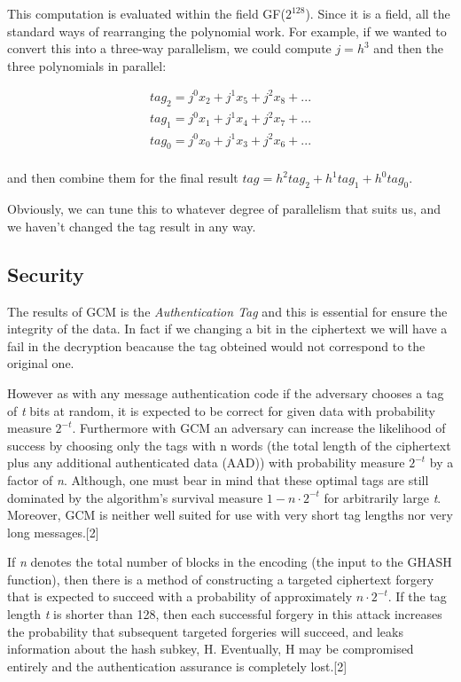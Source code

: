 \documentclass[11pt]{article}
\begin{document}
This computation is evaluated within the field GF($2^{128}$). Since it is a field, all the standard ways of rearranging the polynomial work.
For example, if we wanted to convert this into a three-way parallelism, we could compute $j=h^3$ and then the three polynomials in parallel:

$$
\begin{array}{l}
tag_2 = j^0 x_2 + j^1 x_5 + j^2 x_8 + ... \\
tag_1 = j^0 x_1 + j^1 x_4 + j^2 x_7 + ... \\
tag_0 = j^0 x_0 + j^1 x_3 + j^2 x_6 + ... \\
\end{array}
$$

and then combine them for the final result $ tag = h^2 tag_2 + h^1 tag_1 + h^0 tag_0 $.

Obviously, we can tune this to whatever degree of parallelism that suits us, and we haven't changed the tag result in any way.

\subsection{Security}
The results of GCM is the {\em Authentication Tag} and this is essential for ensure the integrity of the data. In fact if we changing a bit in the ciphertext we will have a fail in the decryption beacause the tag obteined would not correspond to the original one.

However as with any message authentication code if the adversary chooses a tag of {\em t} bits at random, it is expected to be correct for given data with probability measure $2^{-t}$. Furthermore with GCM an adversary can increase the likelihood of success by choosing only the tags with n words (the total length of the ciphertext plus any additional authenticated data (AAD)) with probability measure $2^{-t}$ by a factor of {\em n}. Although, one must bear in mind that these optimal tags are still dominated by the algorithm's survival measure $1 - n\cdot2^{-t}$ for arbitrarily large {\em t}. Moreover, GCM is neither well suited for use with very short tag lengths nor very long messages.[2]

If {\em n} denotes the total number of blocks in the encoding (the input to the GHASH function), then there is a method of constructing a targeted ciphertext forgery that is expected to succeed with a probability of approximately $ n\cdot2^{-t}$. If the tag length {\em t} is shorter than 128, then each successful forgery in this attack increases the probability that subsequent targeted forgeries will succeed, and leaks information about the hash subkey, H. Eventually, H may be compromised entirely and the authentication assurance is completely lost.[2]
\end{document}
